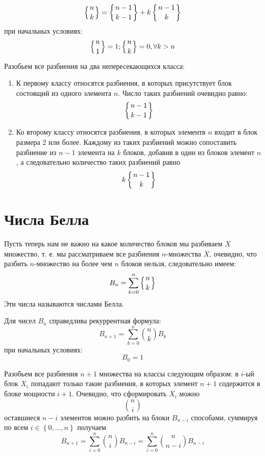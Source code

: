 \begin{equation}
\left\{{{n}\atop{k}}\right\} = \left\{{{n-1}\atop{k-1}}\right\} + k\left\{{{n-1}\atop{k}}\right\}
\end{equation}
при начальных условиях:
\[
	\left\{{{n}\atop{1}}\right\} = 1; \left\{{{n}\atop{k}}\right\} = 0, \forall k > n
\]
\begin{Proof}
Разобьем все разбиения на два непересекающихся класса:
\begin{enumerate}
\item К первому классу относятся разбиения, в которых присутствует блок состоящий из одного элемента $n$. Число таких разбиений очевидно равно: $$ \left\{{{n-1}\atop{k-1}}\right\} $$

\item Ко второму классу относятся разбиения, в которых элементв $n$ входит в блок размера 2 или более. Каждому из таких разбиений можно сопоставить разбиение из $n-1$ элемента на $k$ блоков, добавив в один из блоков элемент $n$, а следовательно количество таких разбиений равно $$ k\left\{{{n-1}\atop{k}}\right\}$$
\end{enumerate}
\end{Proof}

\section{Числа Белла}

Пусть теперь нам не важно на какое количество блоков мы разбиваем $X$ множество, т. е. мы рассматриваем все разбиения $n$-множества $X$, очевидно, что разбить $n$-множество на более чем $n$ блоков нельзя, следовательно имеем:
\begin{equation}
	B_n = \sum_{k=0}^n \left\{{{n}\atop{k}}\right\}
\end{equation}
Эти числа называются числами Белла.

Для чисел $B_n$ справедлива рекуррентная формула:
\begin{equation}
	B_{n+1} = \sum_{k=0}^n \binom{n}{k} B_k
\end{equation}
при начальных условиях:
\[
	B_0 = 1
\]
\begin{Proof}
Разобьем все разбиения $n+1$ множества на классы следующим образом: в $i$-ый блок $X_i$ попадают только такие разбиения, в которых элемент $n+1$ содержится в блоке мощности $i+1$. Очевидно, что сформировать $X_i$ можно $$ \binom{n}{i} $$
оставшиеся $n-i$ элементов можно разбить на блоки $B_{n-i}$ способами, суммируя по всем $i \in \left\{0,...,n\right\}$ получаем $$ B_{n+1} = \sum_{i=0}^n \binom{n}{i} B_{n-i}  = \sum_{i=0}^n\binom{n}{n-i}B_{n-i}$$
\end{Proof}
